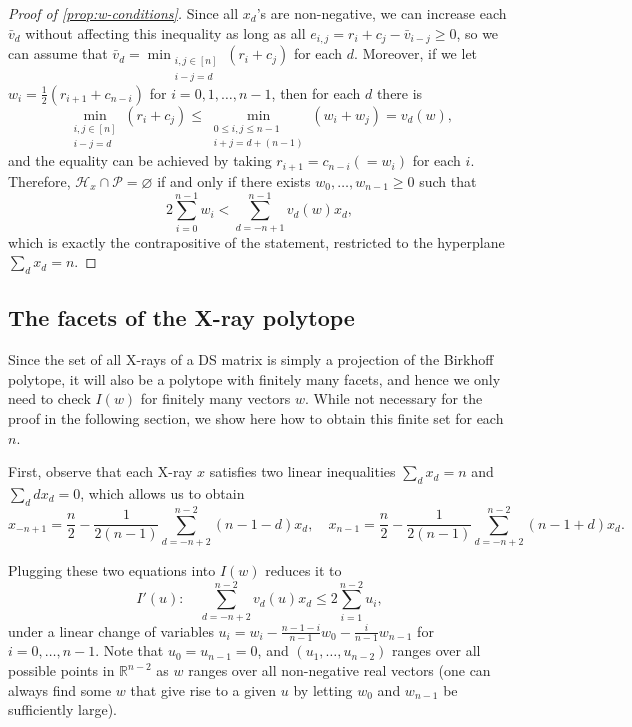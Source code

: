 \documentclass[letterpaper,reqno,11pt]{amsart}
\begin{document}
\begin{proof}[Proof of \cref{prop:w-conditions}]
    Since all $x_d$'s are non-negative, we can increase each $\bar{v}_{d}$ without affecting this inequality as long as all $e_{i,j} = r_i + c_j - \bar{v}_{i-j} \geq 0$, so we can assume that $\bar{v}_{d} = \min_{\substack{i, j\in [n]\\ i-j=d}} (r_i+c_j)$ for each $d$. Moreover, if we let $w_i = \frac{1}{2}(r_{i+1} + c_{n-i})$ for $i = 0, 1, \dots, n-1$, then for each $d$ there is \[\min_{\substack{i, j\in [n]\\ i-j=d}} (r_i+c_j) \leq \min_{\substack{0\leq i, j\leq n-1\\ i+j=d+(n-1)}} (w_i + w_j)=v_d(w),\] and the equality can be achieved by taking $r_{i+1} = c_{n-i} (=w_i)$ for each $i$. Therefore, $\mathcal{H}_x\cap \mathcal{P} = \varnothing$ if and only if there exists $w_0, \dots, w_{n-1}\geq 0$ such that \[ 2\sum_{i=0}^{n-1} w_i < \sum_{d=-n+1}^{n-1} v_d(w)x_d,\] which is exactly the contrapositive of the statement, restricted to the hyperplane $\sum_d x_d = n$.
\end{proof}

\subsection{The facets of the X-ray polytope} Since the set of all X-rays of a DS matrix is simply a projection of the Birkhoff polytope, it will also be a polytope with finitely many facets, and hence we only need to check $I(w)$ for finitely many vectors $w$. While not necessary for the proof in the following section, we show here how to obtain this finite set for each $n$. 

First, observe that each X-ray $x$ satisfies two linear inequalities $\sum_{d} x_d = n$ and $\sum_{d} dx_d = 0$, which allows us to obtain \begin{equation}
    x_{-n+1} = \frac{n}{2}-\frac{1}{2(n-1)}\sum_{d=-n+2}^{n-2}(n-1-d)x_d, \quad x_{n-1} = \frac{n}{2} - \frac{1}{2(n-1)}\sum_{d=-n+2}^{n-2}(n-1+d)x_d. \label{eq:x_end}
\end{equation}

Plugging these two equations into $I(w)$ reduces it to \begin{equation}
    I'(u): \quad \sum_{d=-n+2}^{n-2} v_d(u) x_d \leq 2\sum_{i=1}^{n-2} u_i, \label{eq:i_prime}
\end{equation}under a linear change of variables $u_i = w_i - \frac{n-1-i}{n-1}w_0 - \frac{i}{n-1}w_{n-1}$ for $i = 0, \dots, n-1$. Note that $u_0 = u_{n-1} = 0$, and $(u_1, \dots, u_{n-2})$ ranges over all possible points in $\mathbb{R}^{n-2}$ as $w$ ranges over all non-negative real vectors (one can always find some $w$ that give rise to a given $u$ by letting $w_0$ and $w_{n-1}$ be sufficiently large).
\end{document}
